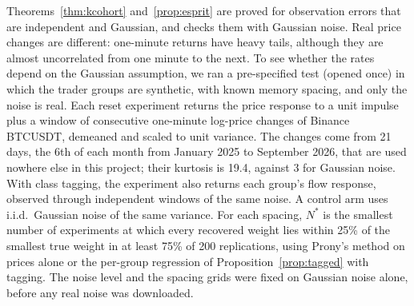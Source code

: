 \documentclass[12pt]{article}
\theoremstyle{definition}
\theoremstyle{remark}
\begin{document}
Theorems~\ref{thm:kcohort} and~\ref{prop:esprit} are proved for observation errors that are independent and Gaussian, and \citet{niroula2026a} checks them with Gaussian noise. Real price changes are different: one-minute returns have heavy tails, although they are almost uncorrelated from one minute to the next. To see whether the rates depend on the Gaussian assumption, we ran a pre-specified test (opened once) in which the trader groups are synthetic, with known memory spacing, and only the noise is real. Each reset experiment returns the price response to a unit impulse plus a window of consecutive one-minute log-price changes of Binance BTCUSDT, demeaned and scaled to unit variance. The changes come from 21 days, the 6th of each month from January 2025 to September 2026, that are used nowhere else in this project; their kurtosis is 19.4, against 3 for Gaussian noise. With class tagging, the experiment also returns each group's flow response, observed through independent windows of the same noise. A control arm uses i.i.d.\ Gaussian noise of the same variance. For each spacing, $N^*$ is the smallest number of experiments at which every recovered weight lies within 25\% of the smallest true weight in at least 75\% of 200 replications, using Prony's method on prices alone or the per-group regression of Proposition~\ref{prop:tagged} with tagging. The noise level and the spacing grids were fixed on Gaussian noise alone, before any real noise was downloaded.
\end{document}
